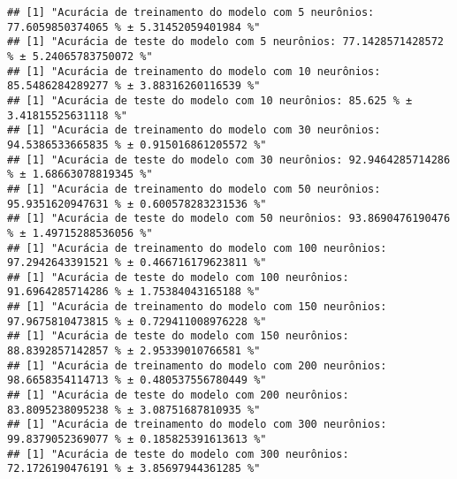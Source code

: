 \documentclass[
]{article}
\newenvironment{Shaded}{\begin{snugshade}}{\end{snugshade}}
\newcommand{\CommentTok}[1]{\textcolor[rgb]{0.56,0.35,0.01}{\textit{#1}}}
\newcommand{\DecValTok}[1]{\textcolor[rgb]{0.00,0.00,0.81}{#1}}
\newcommand{\KeywordTok}[1]{\textcolor[rgb]{0.13,0.29,0.53}{\textbf{#1}}}
\newcommand{\NormalTok}[1]{#1}
\newcommand{\OperatorTok}[1]{\textcolor[rgb]{0.81,0.36,0.00}{\textbf{#1}}}
\newcommand{\StringTok}[1]{\textcolor[rgb]{0.31,0.60,0.02}{#1}}
\begin{document}
\begin{Shaded}
\end{Shaded}

\begin{verbatim}
## [1] "Acurácia de treinamento do modelo com 5 neurônios: 77.6059850374065 % ± 5.31452059401984 %"
## [1] "Acurácia de teste do modelo com 5 neurônios: 77.1428571428572 % ± 5.24065783750072 %"
## [1] "Acurácia de treinamento do modelo com 10 neurônios: 85.5486284289277 % ± 3.88316260116539 %"
## [1] "Acurácia de teste do modelo com 10 neurônios: 85.625 % ± 3.41815525631118 %"
## [1] "Acurácia de treinamento do modelo com 30 neurônios: 94.5386533665835 % ± 0.915016861205572 %"
## [1] "Acurácia de teste do modelo com 30 neurônios: 92.9464285714286 % ± 1.68663078819345 %"
## [1] "Acurácia de treinamento do modelo com 50 neurônios: 95.9351620947631 % ± 0.600578283231536 %"
## [1] "Acurácia de teste do modelo com 50 neurônios: 93.8690476190476 % ± 1.49715288536056 %"
## [1] "Acurácia de treinamento do modelo com 100 neurônios: 97.2942643391521 % ± 0.466716179623811 %"
## [1] "Acurácia de teste do modelo com 100 neurônios: 91.6964285714286 % ± 1.75384043165188 %"
## [1] "Acurácia de treinamento do modelo com 150 neurônios: 97.9675810473815 % ± 0.729411008976228 %"
## [1] "Acurácia de teste do modelo com 150 neurônios: 88.8392857142857 % ± 2.95339010766581 %"
## [1] "Acurácia de treinamento do modelo com 200 neurônios: 98.6658354114713 % ± 0.480537556780449 %"
## [1] "Acurácia de teste do modelo com 200 neurônios: 83.8095238095238 % ± 3.08751687810935 %"
## [1] "Acurácia de treinamento do modelo com 300 neurônios: 99.8379052369077 % ± 0.185825391613613 %"
## [1] "Acurácia de teste do modelo com 300 neurônios: 72.1726190476191 % ± 3.85697944361285 %"
\end{verbatim}
\end{document}
